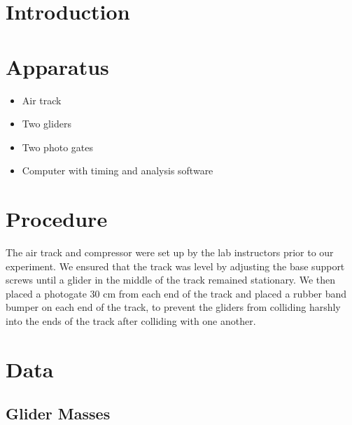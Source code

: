 \documentclass[12pt,letterpaper,titlepage]{report}
\begin{document}







\section*{Introduction}

\noindent



\section*{Apparatus}

\begin{itemize}
    \item Air track
    \item Two gliders
    \item Two photo gates
    \item Computer with timing and analysis software
\end{itemize}


\section*{Procedure}

\noindent
The air track and compressor were set up by the lab instructors prior to
our experiment. We ensured that the track was level by adjusting the base
support screws until a glider in the middle of the track remained stationary.
We then placed a photogate 30 cm from each end of the track and placed a 
rubber band bumper on each end of the track, to prevent the gliders from
colliding harshly into the ends of the track after colliding with one another.


\section*{Data}

\subsection*{Glider Masses}


\end{document}
